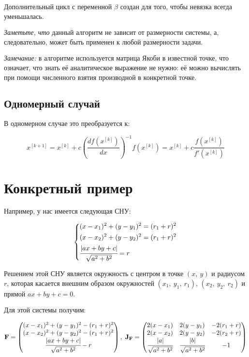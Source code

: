 \documentclass[12pt, a4paper]{article}
\newcommand{\roubr}[1]{\left(#1\right)}
\begin{document}
Дополнительный цикл с переменной $\beta$ создан для того, чтобы невязка всегда уменьшалась.

\textit{Заметьте, что} данный алгоритм не зависит от размерности системы, а, следовательно, может быть применен к любой размерности задачи.

\textit{Замечание:} в алгоритме используется матрица Якоби в известной точке, что означает, что знать её аналитическое выражение не нужно: её можно вычислять при помощи численного взятия производной в конкретной точке.

\subsection{Одномерный случай}

В одномерном случае это преобразуется к:

$$ x^{[k+1]} = x^{[k]} + c \roubr{\frac{d f\roubr{x^{[k]}}}{dx}}^{-1} f\roubr{x^{[k]}} = x^{[k]} + c \frac{f\roubr{x^{[k]}}}{f'\roubr{x^{[k]}}} $$

\section{Конкретный пример}

Например, у нас имеется следующая СНУ:

$$\left\{
\begin{aligned}
	&(x-x_1)^2 + (y-y_1)^2 = (r_1 + r)^2 \\
	&(x-x_2)^2 + (y-y_2)^2 = (r_1 + r)^2 \\
	&\cfrac{|ax + by + c|}{\sqrt{a^2 + b^2}} = r
\end{aligned}
\right.
$$

Решением этой СНУ является окружность с центром в точке $(x,\ y)$ и радиусом $r$, которая касается внешним образом окружностей $(x_1,\ y_1,\ r_1)$, $(x_2,\ y_2,\ r_2)$ и прямой $ax + by + c = 0$.

Для этой системы получим:

$$
\mathbf{F} = \begin{pmatrix}
	(x-x_1)^2 + (y-y_1)^2 - (r_1 + r)^2 \\
	(x-x_2)^2 + (y-y_2)^2 - (r_1 + r)^2 \\
	\cfrac{|ax + by + c|}{\sqrt{a^2 + b^2}} - r
\end{pmatrix},\
\mathbf{J}_\mathbf{F} = \begin{pmatrix}
	2(x-x_1) & 2(y-y_1) & -2(r_1 + r) \\
	2(x-x_2) & 2(y-y_2) & -2(r_2 + r) \\
	\cfrac{|a|}{\sqrt{a^2 + b^2}} & \cfrac{|b|}{\sqrt{a^2 + b^2}} & -1
\end{pmatrix}
$$
\end{document}

